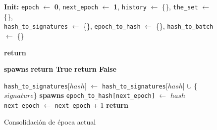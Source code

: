 \begin{figure}[t!]
  \begin{adjustbox}{minipage=[t]{\columnwidth}}
    \begin{algorithm}[H]
      \renewcommand{\thealgorithm}{ABCI Hashchain - Parte 1}
      \caption{Consolidación de época actual}%
      \label{alg:abci-hash1}%
      \small
      \begin{algorithmic}[1]
            \State \textbf{Init:} \texttt{epoch} $\leftarrow$ \textbf{0}, \texttt{next\_epoch} $\leftarrow$ \textbf{1},
			\texttt{history} $\leftarrow$ \{\}, \texttt{the\_set} $\leftarrow$ \{\},
			\\ \texttt{hash\_to\_signatures} $\leftarrow$ \{\}, \texttt{epoch\_to\_hash} $\leftarrow$ \{\}, \texttt{hash\_to\_batch} $\leftarrow$ \{\}

            \label{alg:hash_check_tx}
            				\State \textbf{return} 
            			\EndIf

            		
                		\State \textbf{spawns} \label{line:spawn-reverse-checktx}
                		\State \textbf{return True}
                	\Else
                		\State \textbf{return False}
                	\EndIf
            		\EndFunction
      
            \label{alg:hash_deliver_tx}
            			\State \texttt{hash\_to\_signatures}[$hash$] $\leftarrow$ \texttt{hash\_to\_signatures}[$hash$] $\cup$  \{$signature$\}\label{alg:hash-new-sign}
							\State \textbf{spawns} \label{alg:spawn-reverse}
						\EndIf
            				\State \texttt{epoch\_to\_hash[next\_epoch]} $\leftarrow$ $hash$\label{alg:hash-epoch-to-hash}
            				\State \texttt{next\_epoch} $\leftarrow$ \texttt{next\_epoch} + 1
               	 	\EndIf
               	 \EndIf
                \State \textbf{return}
            \EndFunction
            

\end{algorithmic}
\end{algorithm}
\end{adjustbox}
\end{figure}

